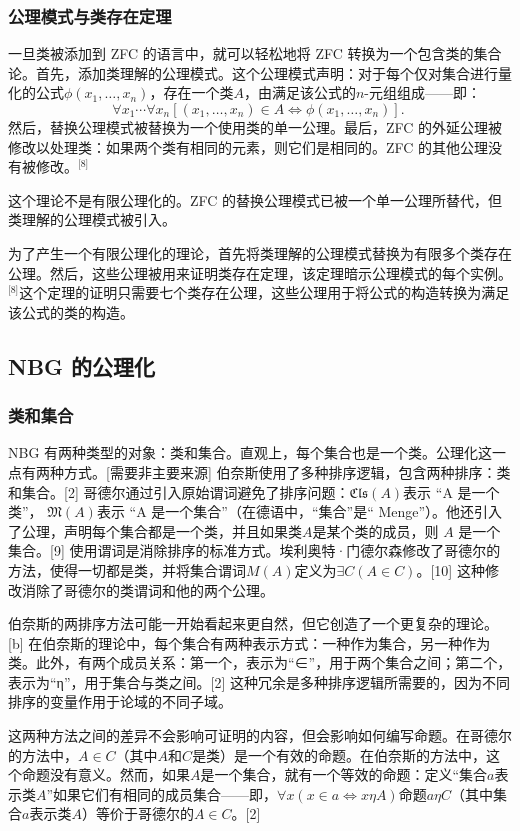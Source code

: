 \subsubsection{公理模式与类存在定理}  
一旦类被添加到 ZFC 的语言中，就可以轻松地将 ZFC 转换为一个包含类的集合论。首先，添加类理解的公理模式。这个公理模式声明：对于每个仅对集合进行量化的公式\( \phi(x_1, \ldots, x_n) \)，存在一个类\( A \)，由满足该公式的\( n \)-元组组成——即：
\[
\forall x_1 \cdots \forall x_n \left[ (x_1, \ldots, x_n) \in A \iff \phi(x_1, \ldots, x_n) \right].~
\]
然后，替换公理模式被替换为一个使用类的单一公理。最后，ZFC 的外延公理被修改以处理类：如果两个类有相同的元素，则它们是相同的。ZFC 的其他公理没有被修改。\(^\text{[8]}\)

这个理论不是有限公理化的。ZFC 的替换公理模式已被一个单一公理所替代，但类理解的公理模式被引入。

为了产生一个有限公理化的理论，首先将类理解的公理模式替换为有限多个类存在公理。然后，这些公理被用来证明类存在定理，该定理暗示公理模式的每个实例。\(^\text{[8]}\)这个定理的证明只需要七个类存在公理，这些公理用于将公式的构造转换为满足该公式的类的构造。
\subsection{NBG 的公理化}  
\subsubsection{类和集合}  
NBG 有两种类型的对象：类和集合。直观上，每个集合也是一个类。公理化这一点有两种方式。[需要非主要来源] 伯奈斯使用了多种排序逻辑，包含两种排序：类和集合。[2] 哥德尔通过引入原始谓词避免了排序问题：\( \mathfrak{Cls}(A) \)表示 “A 是一个类”，  
\( \mathfrak{M}(A) \)表示 “A 是一个集合”（在德语中，“集合”是“ Menge”）。他还引入了公理，声明每个集合都是一个类，并且如果类\( A \)是某个类的成员，则 \( A \) 是一个集合。[9] 使用谓词是消除排序的标准方式。埃利奥特·门德尔森修改了哥德尔的方法，使得一切都是类，并将集合谓词\( M(A) \)定义为\( \exists C (A \in C) \)。[10] 这种修改消除了哥德尔的类谓词和他的两个公理。

伯奈斯的两排序方法可能一开始看起来更自然，但它创造了一个更复杂的理论。[b] 在伯奈斯的理论中，每个集合有两种表示方式：一种作为集合，另一种作为类。此外，有两个成员关系：第一个，表示为“∈”，用于两个集合之间；第二个，表示为“η”，用于集合与类之间。[2] 这种冗余是多种排序逻辑所需要的，因为不同排序的变量作用于论域的不同子域。

这两种方法之间的差异不会影响可证明的内容，但会影响如何编写命题。在哥德尔的方法中，\( A \in C \)（其中\( A \)和\( C \)是类）是一个有效的命题。在伯奈斯的方法中，这个命题没有意义。然而，如果\( A \)是一个集合，就有一个等效的命题：定义“集合\( a \)表示类\( A \)”如果它们有相同的成员集合——即，\(\forall x (x \in a \iff x \eta A)\)命题\( a \eta C \)（其中集合\( a \)表示类\( A \)）等价于哥德尔的\( A \in C \)。[2]

